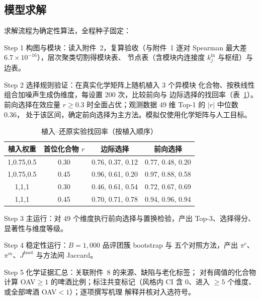 \documentclass[12pt,a4paper]{article}
\begin{document}
\subsection{模型求解}

求解流程为确定性算法，全程种子固定：

Step 1 构图与模块：读入附件~2，复算验收（与附件~1 逐对
Spearman 最大差 $6.7\times10^{-16}$），层次聚类切割得模块表、
节点表（含模块内连接度 $k^{\mathrm{in}}_j$ 与枢纽）与边表。

Step 2 选择规则验证：在真实化学矩阵上随机植入 3 个异模块
化合物、按秩线性组合加噪声生成伪维度，每设置 200 次，比较前向与
边际选择的找回率（表~\ref{tab:recovery}）。前向选择在效应量
$r\ge0.3$ 时全面占优；观测数据 49 维 Top-1 的 $|r|$ 中位数 0.36，
处于该区间，确定前向选择为主方法。模拟仅使用化学矩阵与人工目标。

\begin{table}[!htbp]
  \centering\small
  \caption{植入--还原实验找回率（按植入顺序）}
  \label{tab:recovery}
  \begin{tabular}{cccc}
  \toprule
   植入权重 & 首位化合物 $r$ & 边际选择 & 前向选择 \\
   \midrule
    1,0.75,0.5 & 0.30 & 0.76, 0.37, 0.12 & 0.77, 0.48, 0.20 \\
    1,0.75,0.5 & 0.45 & 0.96, 0.61, 0.20 & 0.97, 0.88, 0.58 \\
    1,1,1 & 0.30 & 0.46, 0.61, 0.54 & 0.72, 0.67, 0.69 \\
    1,1,1 & 0.45 & 0.70, 0.71, 0.78 & 0.94, 0.96, 0.94 \\
    \bottomrule
  \end{tabular}
\end{table}


Step 3 主运行：对 49 个维度执行前向选择与置换检验，产出
Top-3、选择得分、显著性与维度等级。

Step 4 稳定性运行：$B=1{,}000$ 品评团簇 bootstrap 与
五个对照方法，产出 $\pi^c$、$\pi^m$、$J^{\mathrm{boot}}$ 与方法间
Jaccard。

Step 5 化学证据汇总：关联附件~8 的来源、缺陷与老化标签；
对有阈值的化合物计算 OAV$\ge1$ 的啤酒比例；标注共变标记（风格内
CI 含 0、进入 $\ge5$ 个维度、或全部啤酒 OAV$<1$）；逐项撰写机理
解释并核对入选符号。
\end{document}
